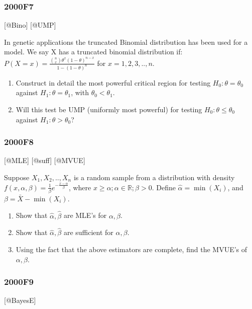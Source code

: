 \documentclass[6pt,Portrait]{article}
\begin{document}
\hypertarget{f7}{%
\subsubsection{2000F7}\label{f7}}

{[}@Bino{]} {[}@UMP{]}

In genetic applications the truncated Binomial distribution has been
used for a model. We say X has a truncated binomial distribution if:
\(P(X=x)=\frac{\binom{n}{x}\theta^x(1-\theta)^{n-x}}{1-(1-\theta)^n}\)
for \(x=1,2,3,..,n\).

\begin{enumerate}
\def\labelenumi{\Alph{enumi})}
\item
  Construct in detail the most powerful critical region for testing
  \(H_0:\theta=\theta_0\) against \(H_1:\theta=\theta_1\), with
  \(\theta_0<\theta_1\).
\item
  Will this test be UMP (uniformly most powerful) for testing
  \(H_0:\theta\le\theta_0\) against \(H_1:\theta>\theta_0\)?
\end{enumerate}

\hypertarget{f8}{%
\subsubsection{2000F8}\label{f8}}

{[}@MLE{]} {[}@suff{]} {[}@MVUE{]}

Suppose \(X_1,X_2,..,X_n\) is a random sample from a distribution with
density \(f(x,\alpha,\beta)=\frac1{\beta}e^{-\frac{x-\alpha}\beta}\),
where \(x\ge\alpha;\alpha\in\mathbb R;\beta>0\). Define
\(\hat\alpha=\min(X_i)\), and \(\beta=\bar X-\min(X_i)\).

\begin{enumerate}
\def\labelenumi{\Alph{enumi})}
\item
  Show that \(\hat\alpha,\hat\beta\) are MLE's for \(\alpha,\beta\).
\item
  Show that \(\hat\alpha,\hat\beta\) are sufficient for
  \(\alpha,\beta\).
\item
  Using the fact that the above estimators are complete, find the MVUE's
  of \(\alpha,\beta\).
\end{enumerate}

\hypertarget{f9}{%
\subsubsection{2000F9}\label{f9}}

{[}@BayesE{]}
\end{document}
